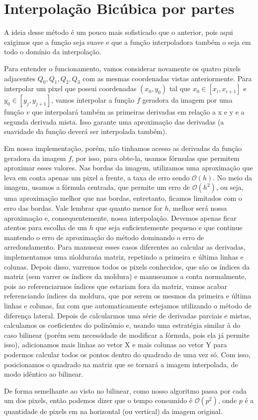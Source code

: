 \documentclass{article}
\begin{document}
	\section{Interpolação Bicúbica por partes}
	A ideia desse método é um pouco mais sofisticado que o anterior, pois aqui exigimos que a função seja suave e que a função interpoladora também o seja em todo o domínio da interpolação. \par
	Para entender o funcionamento, vamos considerar novamente os quatro pixels adjacentes $Q_{0}, Q_{1}, Q_{2}, Q_{3}$ com as mesmas coordenadas vistas anteriormente. Para interpolar um pixel que possui coordenadas $(x_{0}, y_{0})$ tal que $x_{0} \in [x_{i}, x_{i+1}]$ e $y_{0} \in [y_{j}, y_{j+1}]$, vamos interpolar a função $f$ geradora da imagem por uma função $v$ que interpolará também as primeiras derivadas em relação a x e y e a segunda derivada mista. Isso garante uma aproximação das derivadas (a suavidade da função deverá ser interpolada também). \par
	Em nossa implementação, porém, não tinhamos acesso as derivadas da função geradora da imagem $f$, por isso, para obte-la, usamos fórmulas que permitem aproximar esses valores. Nas bordas da imagem, utilizamos uma aproximação que leva em conta apenas um pixel a frente, a taxa de erro sendo $\mathcal{O}(h)$. No meio da imagem, usamos a fórmula centrada, que permite um erro de $\mathcal{O}(h^2)$, ou seja, uma aproximação melhor que nas bordas, entretanto, ficamos limitados com o erro das bordas. Vale lembrar que quanto menor for $h$, melhor será nossa aproximação e, consequentemente, nossa interpolação. Devemos apenas ficar atentos para escolha de um $h$ que seja suficientemente pequeno e que continue mantendo o erro de aproximação do método dominando o erro de arredondamento. Para manusear esses casos diferentes ao calcular as derivadas, implementamos uma \'moldura\' na matriz, repetindo a primeira e última linhas e colunas. Depois disso, varremos todos os pixels conhecidos, que são os índices da matriz (sem varrer os índices da moldura) e manuseamos a conta normalmente, pois ao referenciarmos índices que estariam fora da matriz, vamos acabar referenciando índices da moldura, que por serem os mesmos da primeira e última linhas e colunas, faz com que automaticamente estejamos utilizando o método de diferença lateral. Depois de calcularmos uma série de derivadas parciais e mistas, calculamos os coeficientes do polinômio e, usando uma estratégia similar à do caso bilinear (porém sem necessidade de modificar a fórmula, pois ela já permite isso), adicionamos mais linhas ao vetor X e mais colunas ao vetor Y para podermos calcular todos os pontos dentro do quadrado de uma vez só. Com isso, posicionamos o quadrado na matriz que se tornará a imagem interpolada, de modo idêntico ao bilinear.\par
	De forma semelhante ao visto no bilinear, como nosso algoritmo passa por cada um dos pixels, então podemos dizer que o tempo consumido é $\mathcal{O}(p^2)$, onde $p$ é a quantidade de pixels em na horizontal (ou vertical) da imagem original.
	
\end{document}

